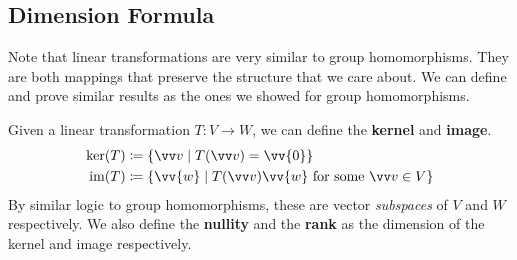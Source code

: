 \subsection{Dimension Formula}
Note that linear transformations are very similar to group homomorphisms. 
They are both mappings that preserve the structure that we care about. 
We can define and prove similar results as the ones we showed for group homomorphisms.

\begin{definition}
    Given a linear transformation $T : V \rightarrow W$, we can define the \textbf{kernel} and \textbf{image}.
    \begin{align*}
        \Ker(T) &\coloneqq \{ \vvv \mid T(\vvv) =\vv{0} \} \\
        \im(T) &\coloneqq \{ \vv{w} \mid T(\vvv) \vv{w} \text{ for some $\vvv \in V$} \} 
    \end{align*}
    By similar logic to group homomorphisms, these are vector \emph{subspaces} of $V$ and $W$ respectively.
    We also define the \textbf{nullity} and the \textbf{rank} as the dimension of the kernel and image respectively.
\end{definition}

